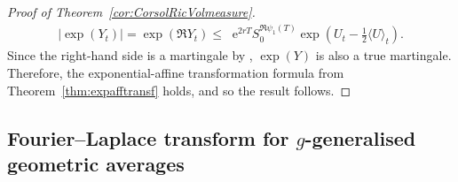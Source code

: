 \documentclass[10pt,a4paper,reqno]{amsart}
\newcommand*{\E}{\mathop{} \mathrm{e}}
\theoremstyle{plain}
\theoremstyle{definition}
\theoremstyle{remark}
\theoremstyle{example}
\begin{document}
\begin{proof}[Proof of Theorem~\ref{cor:CorsolRicVolmeasure}]
    \begin{align*}
        |\exp(Y_t)| = \exp(\Re Y_t) \leq \E^{2r T}S_0^{\Re\psi_1(T)}\exp\left(U_t-\frac{1}{2}\langle U\rangle_t\right).
    \end{align*}
    Since the right-hand side is a martingale by \cite[Lem. 7.3]{abi2019affine}, $\exp(Y)$ is also a true martingale. Therefore, the exponential-affine transformation formula from Theorem~\ref{thm:expafftransf} holds, and so the result follows.
\end{proof}


\subsection[Fourier--Laplace transform for g-generalised geometric averages]{Fourier--Laplace transform for \texorpdfstring{$g$}{g}-generalised geometric averages}\label{sec:proof-CFform}
\end{document}
